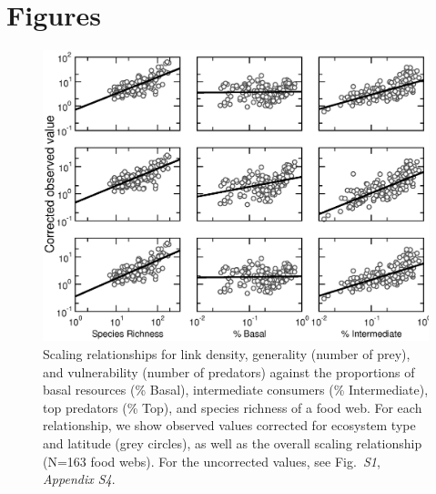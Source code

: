 \documentclass[12pt]{article}
\begin{document}
\begin{spacing}{1.0}
\newpage

\end{spacing}
\newpage

\section*{Figures}
\begin{figure}[h]
\includegraphics[width=.85\textwidth]{Figures/by_TL/scaling_with_S/proportions/fitlines_nonts.eps}
\caption{Scaling relationships for link density, generality (number of prey), 
and vulnerability (number of predators) 
against the proportions of basal resources (\% Basal), intermediate consumers (\% Intermediate), top 
predators (\% Top), and species richness of a food web. 
For each relationship, we show observed values corrected for
ecosystem type and latitude (grey circles), as well as the overall scaling relationship (N=163 food webs). For
the uncorrected values, see Fig.~\emph{S1}, \emph{Appendix S4}.}
\label{props_v_lat}
\end{figure}

\end{document}
